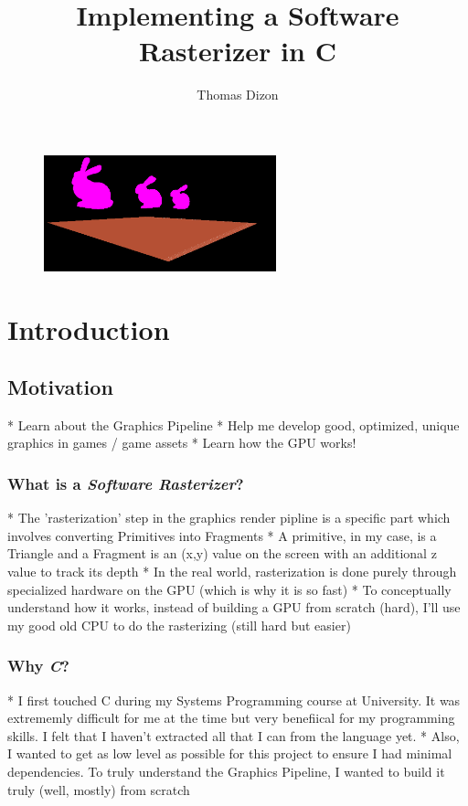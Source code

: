 \documentclass{article}
\author{Thomas Dizon}
\title{Implementing a Software Rasterizer in C}
\begin{document}
\maketitle

\begin{figure}[h]
	\centering
	\includegraphics[width=0.6\textwidth]{scene.png}
	\caption{}
\end{figure}

\newpage

\tableofcontents

\newpage

\section{Introduction}

\subsection{Motivation}
* Learn about the Graphics Pipeline
* Help me develop good, optimized, unique graphics in games / game assets
* Learn how the GPU works!

\subsubsection{What is a \textit{Software Rasterizer}?}
* The 'rasterization' step in the graphics render pipline is a specific part which involves converting Primitives into Fragments
* A primitive, in my case, is a Triangle and a Fragment is an (x,y) value on the screen with an additional z value to track its depth
* In the real world, rasterization is done purely through specialized hardware on the GPU (which is why it is so fast)
* To conceptually understand how it works, instead of building a GPU from scratch (hard), I'll use my good old CPU to do the rasterizing (still hard but easier)

\subsubsection{Why \textit{C}?}
* I first touched C during my Systems Programming course at University. It was extrememly difficult for me at the time but very benefiical for my programming skills. I felt that I haven't extracted all that I can from the language yet.
* Also, I wanted to get as low level as possible for this project to ensure I had minimal dependencies. To truly understand the Graphics Pipeline, I wanted to build it truly (well, mostly) from scratch
\end{document}
